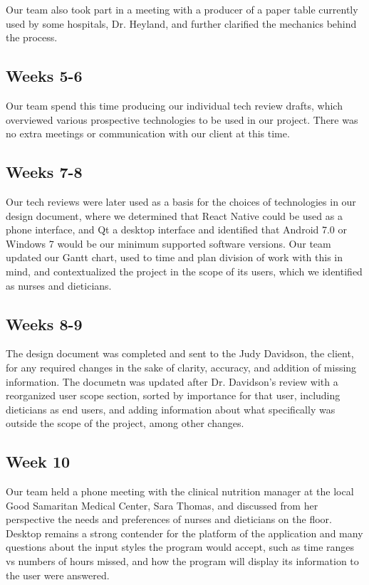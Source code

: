 \documentclass[onecolumn, draftclsnofoot,10pt, compsoc]{IEEEtran}
\begin{document}
Our team also took part in a meeting with a producer of a paper table currently used by some hospitals, Dr. Heyland, and further clarified the mechanics behind the process.
\subsection{Weeks 5-6}
Our team spend this time producing our individual tech review drafts, which overviewed various prospective technologies to be used in our project.
There was no extra meetings or communication with our client at this time.

\subsection{Weeks 7-8}
Our tech reviews were later used as a basis for the choices of technologies in our design document, where we determined that React Native could be used as a phone interface, and Qt a desktop interface and identified that Android 7.0 or Windows 7 would be our minimum supported software versions.
Our team updated our Gantt chart, used to time and plan division of work with this in mind, and contextualized the project in the scope of its users, which we identified as nurses and dieticians.

\subsection{Weeks 8-9}
The design document was completed and sent to the Judy Davidson, the client, for any required changes in the sake of clarity, accuracy, and addition of missing information.
The documetn was updated after Dr. Davidson's review with a reorganized user scope section, sorted by importance for that user, including dieticians as end users, and adding information about what specifically was outside the scope of the project, among other changes.

\subsection{Week 10}
Our team held a phone meeting with the clinical nutrition manager at the local Good Samaritan Medical Center, Sara Thomas, and discussed from her perspective the needs and preferences of nurses and dieticians on the floor.
Desktop remains a strong contender for the platform of the application and many questions about the input styles the program would accept, such as time ranges vs numbers of hours missed, and how the program will display its information to the user were answered.
\end{document}
